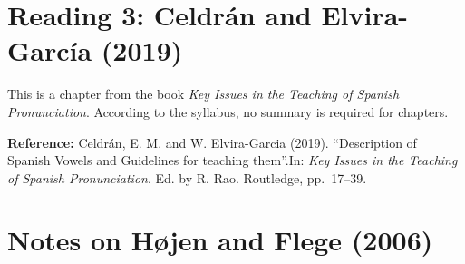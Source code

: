 \documentclass[
]{article}
\begin{document}
\hypertarget{reading-3-celdruxe1n-and-elvira-garcuxeda-2019}{%
\section{Reading 3: Celdrán and Elvira-García
(2019)}\label{reading-3-celdruxe1n-and-elvira-garcuxeda-2019}}

This is a chapter from the book \emph{Key Issues in the Teaching of
Spanish Pronunciation}. According to the syllabus, no summary is
required for chapters.

\textbf{Reference:} Celdrán, E. M. and W. Elvira-Garcia (2019).
``Description of Spanish Vowels and Guidelines for teaching them''.In:
\emph{Key Issues in the Teaching of Spanish Pronunciation}. Ed. by R.
Rao. Routledge, pp.~17--39.

\hypertarget{notes-on-huxf8jen-and-flege-2006}{%
\section{Notes on Højen and Flege
(2006)}\label{notes-on-huxf8jen-and-flege-2006}}
\end{document}
